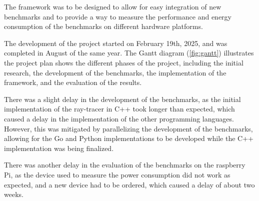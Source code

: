 The framework was to be designed to allow for easy integration of new benchmarks and to provide a way to measure the performance and energy consumption of the benchmarks on different hardware platforms.

The development of the project started on February 19th, 2025, and was completed in August of the same year. The Gantt diagram (\autoref{fig:gantt}) illustrates the project plan shows the different phases of the project, including the initial research, the development of the benchmarks, the implementation of the framework, and the evaluation of the results.

There was a slight delay in the development of the benchmarks, as the initial implementation of the ray-tracer in C++ took longer than expected, which caused a delay in the implementation of the other programming languages. However, this was mitigated by parallelizing the development of the benchmarks, allowing for the Go and Python implementations to be developed while the C++ implementation was being finalized.

There was another delay in the evaluation of the benchmarks on the raspberry Pi, as the device used to measure the power consumption did not work as expected, and a new device had to be ordered, which caused a delay of about two weeks.

